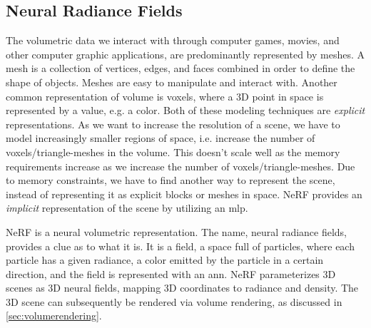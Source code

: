 



\subsection{Neural Radiance Fields}
The volumetric data we interact with through computer games, movies, and other computer graphic applications, are predominantly represented by meshes. A mesh is a collection of vertices, edges, and faces combined in order to define the shape of objects. Meshes are easy to manipulate and interact with. Another common representation of volume is voxels, where a 3D point in space is represented by a value, e.g. a color. Both of these modeling techniques are \textit{explicit} representations. As we want to increase the resolution of a scene, we have to model increasingly smaller regions of space, i.e. increase the number of voxels/triangle-meshes in the volume. This doesn't scale well as the memory requirements increase as we increase the number of voxels/triangle-meshes. Due to memory constraints, we have to find another way to represent the scene, instead of representing it as explicit blocks or meshes in space. NeRF provides an \textit{implicit} representation of the scene by utilizing an \acrshort{mlp}.

NeRF is a neural volumetric representation. The name, neural radiance fields, provides a clue as to what it is. It is a field, a space full of particles, where each particle has a given radiance, a color emitted by the particle in a certain direction, and the field is represented with an \acrshort{ann}. NeRF parameterizes 3D scenes as 3D neural fields, mapping 3D coordinates to radiance and density. The 3D scene can subsequently be rendered via volume rendering, as discussed in \autoref{sec:volumerendering}.


